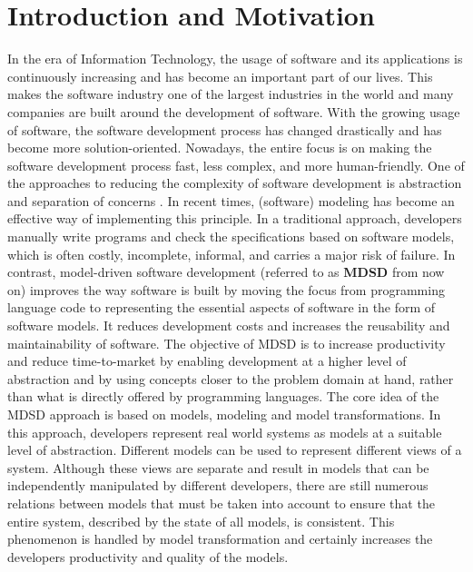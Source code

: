 \section{Introduction and Motivation}\label{sec:introduction}
In the era of Information Technology, the usage of software and its applications is continuously increasing and has become an important part of our lives. This makes the software industry one of the largest industries in the world and many companies are built around the development of software. With the growing usage of software, the software development process has changed drastically and has become more solution-oriented. Nowadays, the entire focus is on making the software development process fast, less complex, and more human-friendly. 
\newline\newline One of the approaches to reducing the complexity of software development is abstraction and separation of concerns \cite{modeltransform}. In recent times, (software) modeling has become an effective way of implementing this principle. In a traditional approach, developers manually write programs and check the specifications based on software models, which is often costly, incomplete, informal, and carries a major risk of failure. In contrast, model-driven software development (referred to as \textbf{MDSD} from now on) improves the way software is built by moving the focus from programming language code to representing the essential aspects of software in the form of software models. It reduces development costs and increases the reusability and maintainability of software. The objective of MDSD \cite{modeltransform} is to increase productivity and reduce time-to-market by enabling development at a higher level of abstraction and by using concepts closer to the problem domain at hand, rather than what is directly offered by programming languages. 
\newline\newline The core idea of the MDSD approach is based on models, modeling and model transformations. In this approach, developers represent real world systems as models at a suitable level of abstraction. Different models can be used to represent different views of a system.  Although these views are separate and result in models that can be independently manipulated by different developers, there are still numerous relations between models that must be taken into account to ensure that the entire system, described by the state of all models, is consistent. This phenomenon is handled by model transformation and certainly increases the developers productivity and quality of the models.

